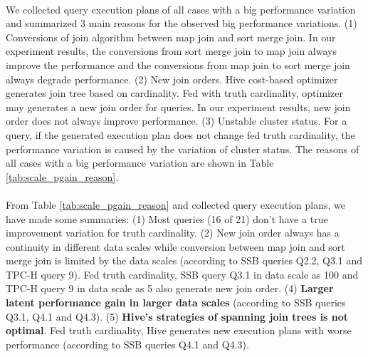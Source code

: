             \paragraph{}
            We collected query execution plans of all cases with a big performance variation and summarized 3 main reasons for the observed big performance variations. (1) 
            Conversions of join algorithm between map join and sort merge join. In our experiment results, the conversions from sort merge join to map join always 
            improve the performance and the conversions from map join to sort merge join always degrade performance. (2) New join orders. Hive cost-based optimizer 
            generates join tree based on cardinality. Fed with truth cardinality, optimizer may generates a new join order for queries. In our experiment results, new 
            join order does not always improve performance. (3) Unstable cluster status. For a query, if the generated execution plan does not change fed truth 
            cardinality, the performance variation is caused by the variation of cluster status. The reasons of all cases with a big performance variation are shown in 
            Table \ref{tab:scale_pgain_reason}. 
            \paragraph{}
            From Table \ref{tab:scale_pgain_reason} and collected query execution plans, we have made some summaries:
            \newline
            (1) Most queries (16 of 21) don't have a true improvement variation for truth cardinality.   
            \newline 
            (2) New join order always has a continuity in different data scales while conversion between map join and sort merge join is limited by the data scales 
            (according to SSB queries Q2.2, Q3.1 and TPC-H query 9). Fed truth cardinality, SSB query Q3.1 in data scale as 100 and TPC-H query 9 in data scale as 5 
            also generate new join order. 
            \newline
            (4) \textbf{Larger latent performance gain in larger data scales} (according to SSB queries Q3.1, Q4.1 and Q4.3). 
            \newline 
            (5) \textbf{Hive's strategies of spanning join trees is not optimal}. Fed truth cardinality, Hive generates new execution plans with worse performance (according 
            to SSB queries Q4.1 and Q4.3).
               
